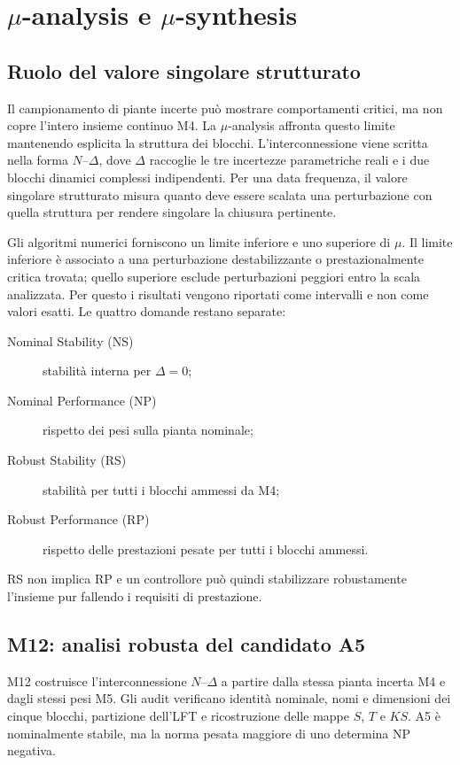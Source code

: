 \chapter{$\mu$-analysis e $\mu$-synthesis}
\section{Ruolo del valore singolare strutturato}
Il campionamento di piante incerte può mostrare comportamenti critici, ma non copre l'intero insieme continuo M4. La $\mu$-analysis affronta questo limite mantenendo esplicita la struttura dei blocchi. L'interconnessione viene scritta nella forma $N$--$\Delta$, dove $\Delta$ raccoglie le tre incertezze parametriche reali e i due blocchi dinamici complessi indipendenti. Per una data frequenza, il valore singolare strutturato misura quanto deve essere scalata una perturbazione con quella struttura per rendere singolare la chiusura pertinente.

Gli algoritmi numerici forniscono un limite inferiore e uno superiore di $\mu$. Il limite inferiore è associato a una perturbazione destabilizzante o prestazionalmente critica trovata; quello superiore esclude perturbazioni peggiori entro la scala analizzata. Per questo i risultati vengono riportati come intervalli e non come valori esatti. Le quattro domande restano separate:
\begin{description}
\item[Nominal Stability (NS)] stabilità interna per $\Delta=0$;
\item[Nominal Performance (NP)] rispetto dei pesi sulla pianta nominale;
\item[Robust Stability (RS)] stabilità per tutti i blocchi ammessi da M4;
\item[Robust Performance (RP)] rispetto delle prestazioni pesate per tutti i blocchi ammessi.
\end{description}
RS non implica RP e un controllore può quindi stabilizzare robustamente l'insieme pur fallendo i requisiti di prestazione.

\section{M12: analisi robusta del candidato A5}
M12 costruisce l'interconnessione $N$--$\Delta$ a partire dalla stessa pianta incerta M4 e dagli stessi pesi M5. Gli audit verificano identità nominale, nomi e dimensioni dei cinque blocchi, partizione dell'LFT e ricostruzione delle mappe $S$, $T$ e $KS$. A5 è nominalmente stabile, ma la norma pesata maggiore di uno determina NP negativa.

